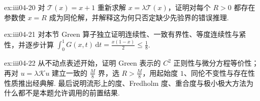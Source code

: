 \begin{FAExercise}[缺少先验界时紧性不足的反例]{ex:iii04-20}
对 \(\displaystyle\mathcal T(x)=x+1\) 重新求解 \(\displaystyle x=\lambda\mathcal T(x)\)，证明对每个 \(\displaystyle R>0\) 都存在参数使 \(\displaystyle x=R\) 成为同伦解，并解释这为何只否定缺少先验界的错误推理.
\end{FAExercise}

\begin{FAExercise}{ex:iii04-21}
对本节 Green 算子独立证明连续性、一致有界性、等度连续性与紧性，并逐步计算 \(\displaystyle\int_0^1G(x,t)\,\mathrm{d}t=\frac{x(1-x)}{2}\leqslant\frac{1}{8}\).
\end{FAExercise}

\begin{FAExercise}[完整重建非线性边值问题的延拓]{ex:iii04-22}
从不动点表述开始，证明 Green 表示的 \(\displaystyle C^2\) 正则性与微分方程等价性；再对 \(\displaystyle u=\lambda\mathcal Ku\) 建立一致的 \(\displaystyle \frac{M}{8}\) 界，选 \(\displaystyle R>\frac{M}{8}\)，用起始度 \(\displaystyle1\)、同伦不变性与存在性性质推出经典解. 最后说明流形上的度、Fredholm 度、重合度与极小极大方法为什么都不是本题允许调用的前置结果.
\end{FAExercise}
